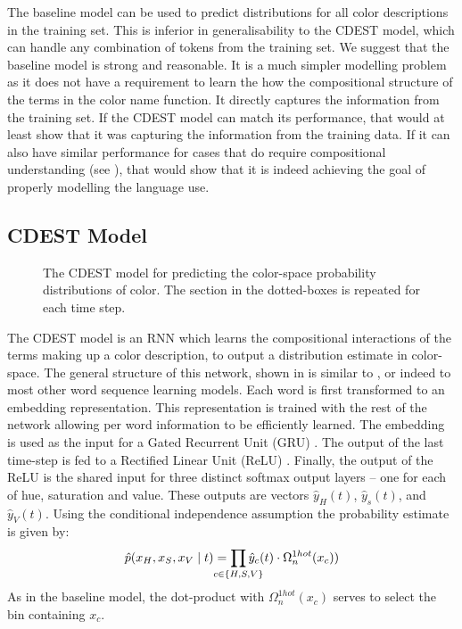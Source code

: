 \documentclass[11pt,a4paper]{article}
\newcommand{\parencite}{\citep}
\newcommand{\textcite}{\citet}
\begin{document}
The baseline model can be used to predict distributions for all color descriptions in the training set.
This is inferior in generalisability to the CDEST model, which can handle any combination of tokens from the training set.
We suggest that the baseline model is strong and reasonable.
It is a much simpler modelling problem as it does not have a requirement to learn the how the compositional structure of the terms in the color name function.
It directly captures the information from the training set.
If the CDEST model can match its performance, that would at least show that it was capturing the information from the training data.
If it can also have similar performance for cases that do require compositional understanding (see ), that would show that it is indeed achieving the goal of properly modelling the language use.

\subsection{CDEST Model}

\begin{figure}
	\resizebox{\columnwidth}{!}{}
	
	\caption{\label{network}
		The CDEST model for predicting the color-space probability distributions of color.
		The section in the dotted-boxes is repeated for each time step.
	}
\end{figure}

The CDEST model is an RNN which learns the compositional interactions of the terms making up a color description, to output a distribution estimate in color-space.
The general structure of this network, shown in  is similar to \textcite{2016arXiv160603821M}, or indeed to most other word sequence learning models.
Each word is first transformed to an embedding representation.
This representation is trained with the rest of the network allowing per word information to be efficiently learned.
The embedding is used as the input for a Gated Recurrent Unit (GRU)  \parencite{cho2014properties}.
The output of the last time-step is fed to a Rectified Linear Unit (ReLU)  \parencite{dahl2013reludropout}.
Finally, the output of the ReLU is the shared input for three distinct softmax output layers -- one for each of hue, saturation and value.
These outputs are vectors $\hat{y}_{H}(t)$, $\hat{y}_{s}(t)$, and $\hat{y}_{V}(t)$.
Using the conditional independence assumption the probability estimate is given by:
\[
	\hat{p}(x_H,x_S,x_V\mid t) = \displaystyle\prod_{
		\mathclap{c\in {\{H,S,V\}}}}
	 \hat{y}_{c}(t)\cdot \Omega_{n}^{1hot}(x_c))
\]
As in the baseline model, the dot-product with $\Omega_{n}^{1hot}(x_c)$ serves to select the bin containing $x_c$.
\end{document}
